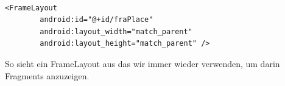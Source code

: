 \documentclass[FIPLY_base.tex]{subfiles}
\begin{document}
\ \\
\begin{lstlisting}
<FrameLayout
        android:id="@+id/fraPlace"
        android:layout_width="match_parent"
        android:layout_height="match_parent" />
\end{lstlisting}
So sieht ein FrameLayout aus das wir immer wieder verwenden, um darin Fragments anzuzeigen.

\end{document}
